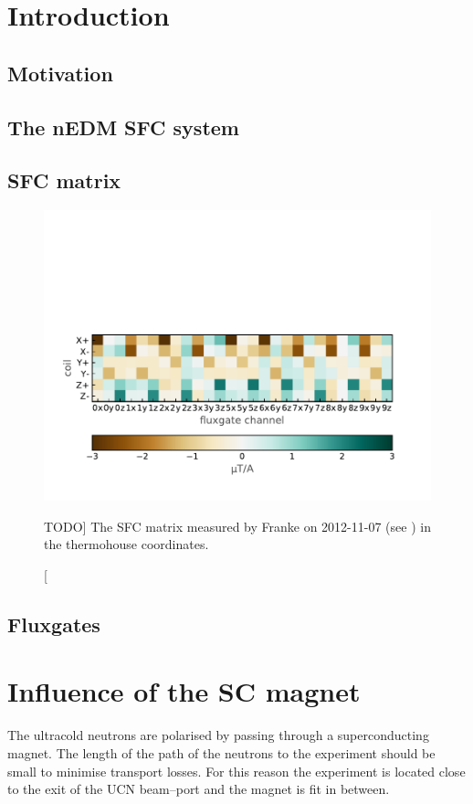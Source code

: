 \section{Introduction}
\cite{Franke2013}

\subsection{Motivation}

\subsection{The nEDM SFC system}

\subsection{SFC matrix}
\begin{figure}[bth]
  \myfloatalign
  \includegraphics[width=.8\linewidth]{gfx/nEDM_SFC/nEDM_SFC_matrix}
  \caption
  [TODO]
  {The SFC matrix measured by Franke on 2012-11-07 (see \cite{Franke2013}) in the thermohouse coordinates.}
  \label{fig:nEDM_SFC_matrix}
\end{figure}

\subsection{Fluxgates}


\section{Influence of the SC magnet}
The ultracold neutrons are polarised by passing through a superconducting magnet. The length of the path of the neutrons to the experiment should be small to minimise transport losses. For this reason the experiment is located close to the exit of the UCN beam--port and the magnet is fit in between.

